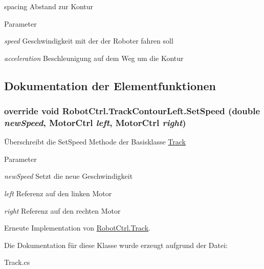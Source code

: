 spacing Abstand zur Kontur 
\begin{DoxyParams}{Parameter}
\item[{\em speed}]Geschwindigkeit mit der der Roboter fahren soll \item[{\em acceleration}]Beschleunigung auf dem Weg um die Kontur \end{DoxyParams}


\subsection{Dokumentation der Elementfunktionen}
\hypertarget{class_robot_ctrl_1_1_track_contour_left_ae7938250af614625cd08a498c0f15195}{
\subsubsection[{SetSpeed}]{\setlength{\rightskip}{0pt plus 5cm}override void RobotCtrl.TrackContourLeft.SetSpeed (double {\em newSpeed}, \/  {\bf MotorCtrl} {\em left}, \/  {\bf MotorCtrl} {\em right})}}
\label{class_robot_ctrl_1_1_track_contour_left_ae7938250af614625cd08a498c0f15195}
\"{U}berschreibt die SetSpeed Methode der Basisklasse \hyperlink{class_robot_ctrl_1_1_track}{Track}


\begin{DoxyParams}{Parameter}
\item[{\em newSpeed}]Setzt die neue Geschwindigkeit \item[{\em left}]Referenz auf den linken Motor \item[{\em right}]Referenz auf den rechten Motor \end{DoxyParams}


Erneute Implementation von \hyperlink{class_robot_ctrl_1_1_track_a9abc3ccf4bf1d9db8d461f2cb4b4b0d3}{RobotCtrl.Track}.



Die Dokumentation für diese Klasse wurde erzeugt aufgrund der Datei:\begin{DoxyCompactItemize}
\item 
Track.cs\end{DoxyCompactItemize}
